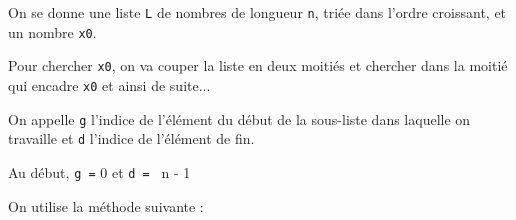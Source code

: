 	
%
%
%
%
%
%
%
%
%


On se donne une liste \texttt{L} de nombres de longueur \texttt{n}, {triée dans l'ordre croissant}, et un nombre \texttt{x0}. 

Pour chercher \texttt{x0}, on va couper la liste en deux moitiés et chercher dans la moitié qui encadre \texttt{x0} et ainsi de suite...

On appelle \texttt{g} l'indice de l'élément du début de la sous-liste dans laquelle on travaille et \texttt{d} l'indice de l'élément de fin.

Au début, \texttt{g =} {0} et \texttt{d = } {n - 1}

%

\medskip 
On utilise la méthode suivante :

